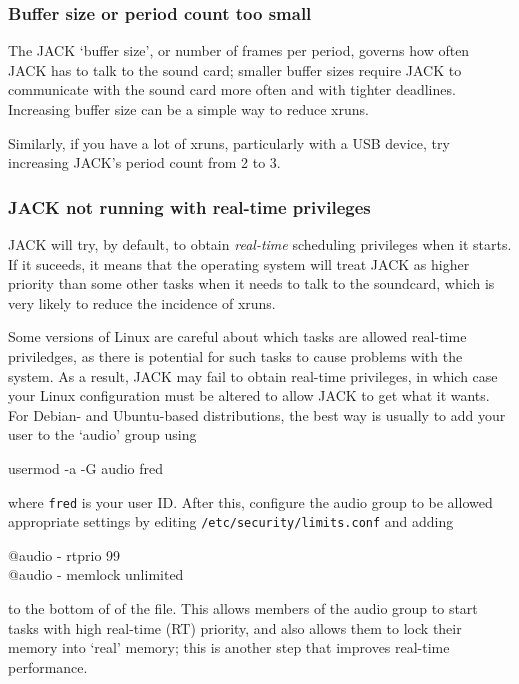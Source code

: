 \documentclass[10pt,a4paper]{book}
\begin{document}
\subsubsection{Buffer size or period count too small}

The JACK `buffer size', or number of frames per period, governs how
often JACK has to talk to the sound card; smaller buffer sizes require
JACK to communicate with the sound card more often and with tighter
deadlines.  Increasing buffer size can be a simple way to reduce
xruns.

Similarly, if you have a lot of xruns, particularly with a USB device,
try increasing JACK's period count from 2 to 3.


\subsubsection{JACK not running with real-time privileges}

JACK will try, by default, to obtain \emph{real-time} scheduling
privileges when it starts.  If it suceeds, it means that the
operating system will treat JACK as higher priority than some other
tasks when it needs to talk to the soundcard, which is very likely to
reduce the incidence of xruns.

Some versions of Linux are careful about which tasks are allowed
real-time priviledges, as there is potential for such tasks to cause
problems with the system.  As a result, JACK may fail to obtain
real-time privileges, in which case your Linux configuration must be
altered to allow JACK to get what it wants.  For Debian- and
Ubuntu-based distributions, the best way is usually to add your user
to the `audio' group using

\begin{listing}
usermod -a -G audio fred
\end{listing}

where \texttt{fred} is your user ID\@.  After this, configure the audio
group to be allowed appropriate settings by editing
\texttt{/etc/security/limits.conf} and adding

\begin{listing}
@audio - rtprio 99\\
@audio - memlock unlimited
\end{listing}

to the bottom of of the file.  This allows members of the audio group
to start tasks with high real-time (RT) priority, and also allows them
to lock their memory into `real' memory; this is another step that
improves real-time performance.
\end{document}
